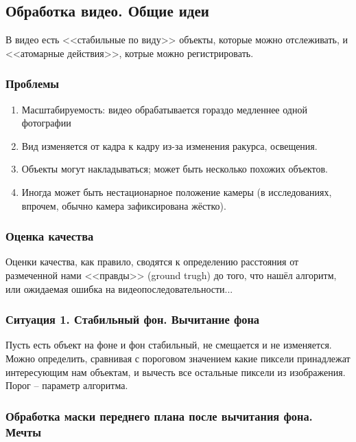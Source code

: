 \documentclass[main.tex]{subfiles}
\begin{document}
\subsection{Обработка видео. Общие идеи}

В видео есть <<стабильные по виду>> объекты, которые можно отслеживать, и <<атомарные действия>>, котрые можно регистрировать.

\subsubsection{Проблемы}

\begin{enumerate}[noitemsep]
	\item Масштабируемость: видео обрабатывается гораздо медленнее одной фотографии
	\item Вид изменяется от кадра к кадру из-за изменения ракурса, освещения.
	\item Объекты могут накладываться; может быть несколько похожих объектов.
	\item Иногда может быть нестационарное положение камеры (в исследованиях, впрочем, обычно камера зафиксирована жёстко).
\end{enumerate}

\subsubsection{Оценка качества}

Оценки качества, как правило, сводятся к определению расстояния от размеченной нами <<правды>> (ground trugh) до того, что нашёл алгоритм, или ожидаемая ошибка на видеопоследовательности...

\subsubsection{Ситуация 1. Стабильный фон. Вычитание фона}

Пусть есть объект на фоне и фон стабильный, не смещается и не изменяется.
Можно определить, сравнивая с пороговом значением какие пиксели принадлежат интересующим нам объектам, и вычесть все остальные пиксели из изображения.
Порог -- параметр алгоритма.

\subsubsection{Обработка маски переднего плана после вычитания фона. Мечты}
\end{document}

